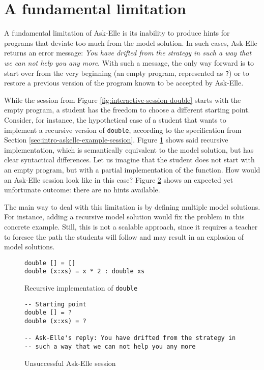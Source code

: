 \section{A fundamental limitation}
\label{sec:intro-fundamental-limitation}

A fundamental limitation of Ask-Elle is its inability to produce hints for programs that deviate too much from the model solution. In such cases, Ask-Elle returns an error message: \emph{You have drifted from the strategy in such a way that we can not help you any more}. With such a message, the only way forward is to start over from the very beginning (an empty program, represented as \texttt{?}) or to restore a previous version of the program known to be accepted by Ask-Elle.

While the session from Figure \ref{fig:interactive-session-double} starts with the empty program, a student has the freedom to choose a different starting point. Consider, for instance, the hypothetical case of a student that wants to implement a recursive version of \texttt{double}, according to the specification from Section \ref{sec:intro-askelle-example-session}. Figure \ref{fig:limitations-recursive-double} shows said recursive implementation, which is semantically equivalent to the model solution, but has clear syntactical differences. Let us imagine that the student does not start with an empty program, but with a partial implementation of the function. How would an Ask-Elle session look like in this case? Figure \ref{fig:limitations-askelle-example-session} shows an expected yet unfortunate outcome: there are no hints available.

The main way to deal with this limitation is by defining multiple model solutions. For instance, adding a recursive model solution would fix the problem in this concrete example. Still, this is not a scalable approach, since it requires a teacher to foresee the path the students will follow and may result in an explosion of model solutions.

\begin{figure}
\begin{verbatim}
double [] = []
double (x:xs) = x * 2 : double xs
\end{verbatim}
\caption{Recursive implementation of \texttt{double}}
\label{fig:limitations-recursive-double}
\end{figure}

\begin{figure}
\begin{verbatim}
-- Starting point
double [] = ?
double (x:xs) = ?

-- Ask-Elle's reply: You have drifted from the strategy in
-- such a way that we can not help you any more
\end{verbatim}
\caption{Unsuccessful Ask-Elle session}
\label{fig:limitations-askelle-example-session}
\end{figure}

